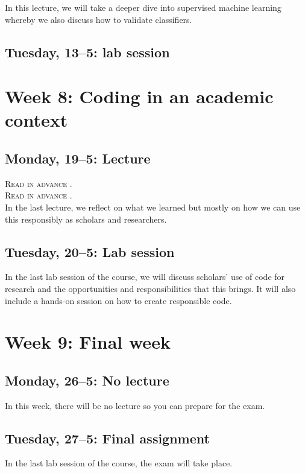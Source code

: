 In this lecture, we will take a deeper dive into supervised machine learning whereby we also discuss how to validate classifiers.

\subsection*{Tuesday, 13--5: lab session}


\section*{Week 8: Coding in an academic context}

\subsection*{Monday, 19--5: Lecture}
\textsc{ Read in advance \cite{hube_understanding_2019}.} \\
\textsc{ Read in advance \cite{bender_dangers_2021}.} \\

In the last lecture, we reflect on what we learned but mostly on how we can use this responsibly as scholars and researchers. 

\subsection*{Tuesday, 20--5: Lab session}
In the last lab session of the course, we will discuss scholars' use of code for research and the opportunities and responsibilities that this brings. It will also include a hands-on session on how to create responsible code.

\section*{Week 9: Final week}

\subsection*{Monday, 26--5: No lecture}
In this week, there will be no lecture so you can prepare for the exam.

\subsection*{Tuesday, 27--5: Final assignment}
In the last lab session of the course, the exam will take place. 








